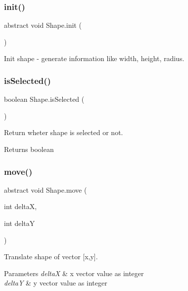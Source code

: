 \subsubsection{\texorpdfstring{init()}{init()}}
{\footnotesize\ttfamily abstract void Shape.\+init (\begin{DoxyParamCaption}{ }\end{DoxyParamCaption})\hspace{0.3cm}{\ttfamily [abstract]}}

Init shape -\/ generate information like width, height, radius. \mbox{\label{class_shape_aa1c3adc5bee37da4d5972965caaec344}} 
\subsubsection{\texorpdfstring{is\+Selected()}{isSelected()}}
{\footnotesize\ttfamily boolean Shape.\+is\+Selected (\begin{DoxyParamCaption}{ }\end{DoxyParamCaption})}

Return wheter shape is selected or not. \begin{DoxyReturn}{Returns}
boolean 
\end{DoxyReturn}
\mbox{\label{class_shape_ac6c07cfa25f740b78af1c212d111fb1e}} 
\subsubsection{\texorpdfstring{move()}{move()}}
{\footnotesize\ttfamily abstract void Shape.\+move (\begin{DoxyParamCaption}\item[{int}]{deltaX,  }\item[{int}]{deltaY }\end{DoxyParamCaption})\hspace{0.3cm}{\ttfamily [abstract]}}

Translate shape of vector \mbox{[}x,y\mbox{]}. 
\begin{DoxyParams}{Parameters}
{\em deltaX} & x vector value as integer \\
\hline
{\em deltaY} & y vector value as integer \\
\hline
\end{DoxyParams}
\mbox{\label{class_shape_aeb76c0ca3c4e20d02d172ba4ce83bd2d}} 
